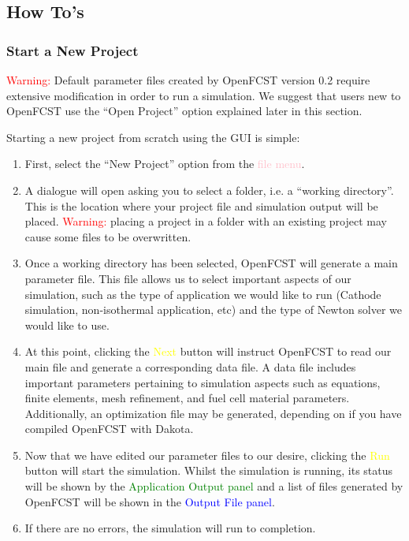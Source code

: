 \subsection{How To's}
\subsubsection{Start a New Project} \label{sec:start_new_project_gui}
\textcolor{red}{Warning:} Default parameter files created by OpenFCST version 0.2 require extensive modification in order to run a simulation. We suggest that users new to OpenFCST use the ``Open Project'' option explained later in this section.

Starting a new project from scratch using the GUI is simple:

\begin{enumerate}
 \item First, select the ``New Project'' option from the \textcolor{pink}{file menu}.
 \item A dialogue will open asking you to select a folder, i.e. a ``working directory''. This is the location  where your project file and simulation output will be placed. \textcolor{red}{Warning:} placing a project in a folder with an existing project may cause some files to be overwritten.
 \item Once a working directory has been selected, OpenFCST will generate a main parameter file. This file allows us to select important aspects of our simulation, such as the type of application we would like to run (Cathode simulation, non-isothermal application, etc) and the type of Newton solver we would like to use.
 \item At this point, clicking the \textcolor{yellow}{Next} button will instruct OpenFCST to read our main file and generate a corresponding data file. A data file includes important parameters pertaining to simulation aspects such as equations,  finite elements,  mesh refinement, and fuel cell material parameters. Additionally, an optimization file may be generated, depending on if you have compiled OpenFCST with Dakota.
 \item Now that we have edited our parameter files to our desire, clicking the \textcolor{yellow}{Run} button will start the simulation. Whilst the simulation is running, its status will be shown by the \textcolor{green}{Application Output panel} and a list of files generated by OpenFCST will be shown in the \textcolor{blue}{Output File panel}.
 \item If there are no errors, the simulation will run to completion.
\end{enumerate}

